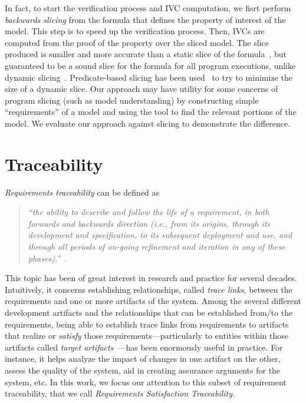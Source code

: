 In fact, to start the verification process and IVC computation, we fisrt perform {\em backwards slicing} from the formula that defines the property of interest of the model. This step is to speed up the verification process.
 Then, IVCs are computed from the proof of the property over the sliced model.  The slice produced is smaller and more accurate than a static slice of the formula~\cite{Weiser:1981:slicing}, but guaranteed to be a sound slice for the formula for all program executions, unlike dynamic slicing~\cite{Agrawal:1990:slicing}.  Predicate-based slicing has been used~\cite{Li04:slicing} to try to minimize the size of a dynamic slice.  Our approach may have utility for some concerns of program slicing (such as model understanding) by constructing simple ``requirements'' of a model and using the tool to find the relevant portions of the model. We evaluate our approach against slicing to demonstrate the difference.

\section{Traceability}
\emph{Requirements traceability} can be defined as

\begin{quotation}
\textit{``the ability to describe and follow the life of a requirement, in both forwards and backwards direction (i.e., from its origins, through its development and specification, to its subsequent deployment and use, and through all periods of on-going refinement and iteration in any of these phases).''}~\cite{gotel}.
\end{quotation}

This topic has been of great interest in research and practice for several decades. Intuitively, it concerns establishing relationships, called \emph{trace links}, between the requirements and one or more artifacts of the system.
Among the several different development artifacts and the relationships that can be established from/to the requirements, being able to establish trace links from requirements to artifacts that realize or \emph{satisfy} those requirements---particularly
to entities within those artifacts called \emph{target artifacts}~\cite{gotel2012traceability}---has been enormously useful in practice. For instance, it helps analyze the impact of changes in one artifact on the other, assess the quality of the system, aid in creating assurance arguments for the system, etc. In this work, we focus our attention to this subset of requirement traceability, that we call \emph{Requirements Satisfaction Traceability.}

